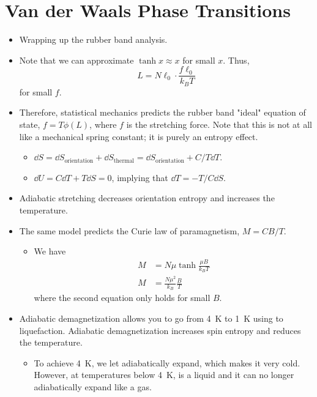\documentclass[../notes.tex]{subfiles}
\begin{document}
\section{Van der Waals Phase Transitions}
\begin{itemize}
    \item {}Wrapping up the rubber band analysis.
    \item Note that we can approximate $\tanh x\approx x$ for small $x$. Thus,
    \begin{equation*}
        L = N\ell_0\cdot\frac{f\ell_0}{k_BT}
    \end{equation*}
    for small $f$.
    \item Therefore, statistical mechanics predicts the rubber band "ideal" equation of state, $f=T\phi(L)$, where $f$ is the stretching force. Note that this is not at all like a mechanical spring constant; it is purely an entropy effect.
    \begin{itemize}
        \item $\dd{S}=\dd{S_\text{orientation}}+\dd{S_\text{thermal}}=\dd{S_\text{orientation}}+C/T\dd{T}$.
        \item $\dd{U}=C\dd{T}+T\dd{S}=0$, implying that $\dd{T}=-T/C\dd{S}$.
    \end{itemize}
    \item Adiabatic stretching decreases orientation entropy and increases the temperature.
    \item The same model predicts the Curie law of paramagnetism, $M=CB/T$.
    \begin{itemize}
        \item We have
        \begin{align*}
            M &= N\mu\tanh\frac{\mu B}{k_BT}\\
            M &= \frac{N\mu^2}{k_B}\frac{B}{T}
        \end{align*}
        where the second equation only holds for small $B$.
    \end{itemize}
    \item Adiabatic demagnetization allows you to go from \SI{4}{\kelvin} to \SI{1}{\kelvin} using  to  liquefaction. Adiabatic demagnetization increases spin entropy and reduces the temperature.
    \begin{itemize}
        \item To achieve \SI{4}{\kelvin}, we let  adiabatically expand, which makes it very cold. However, at temperatures below \SI{4}{\kelvin},  is a liquid and it can no longer adiabatically expand like a gas.

\end{itemize}
\end{itemize}
\end{document}
